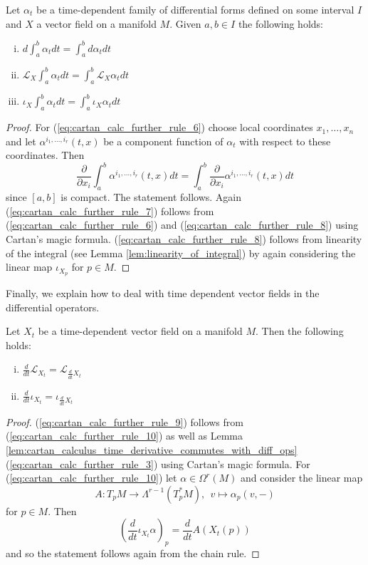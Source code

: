 \begin{lemma}
    Let $\alpha_t$ be a time-dependent family of differential forms defined on some interval $I$ and $X$ a vector field on a manifold $M$. Given $a,b \in I$ the following holds: 
    \begin{enumerate}[(i)]
        \item $d \int_{a}^{b} \alpha_t dt = \int_{a}^{b} d\alpha_t dt$ \label{eq:cartan_calc_further_rule_6}
        \item $\mathcal{L}_X \int_{a}^{b} \alpha_t dt = \int_{a}^{b} \mathcal{L}_X\alpha_t dt$\label{eq:cartan_calc_further_rule_7}
        \item $\iota_X \int_{a}^{b} \alpha_t dt = \int_{a}^{b} \iota_X\alpha_t dt$\label{eq:cartan_calc_further_rule_8}
    \end{enumerate}
\end{lemma}
\begin{proof}
    For (\ref{eq:cartan_calc_further_rule_6}) choose local coordinates $x_1,\ldots,x_n$ and let $\alpha^{i_1,\ldots,i_r}(t,x)$ be a component function of $\alpha_t$ with respect to these coordinates. Then 
    \[
    \frac{\partial}{\partial x_i} \int_{a}^{b} \alpha^{i_1,\ldots,i_r}(t,x) dt = \int_{a}^{b}  \frac{\partial}{\partial x_i} \alpha^{i_1,\ldots,i_r}(t,x) dt
    \]
    since $[a,b]$ is compact. The statement follows. Again (\ref{eq:cartan_calc_further_rule_7}) follows from (\ref{eq:cartan_calc_further_rule_6}) and (\ref{eq:cartan_calc_further_rule_8}) using Cartan's magic formula. (\ref{eq:cartan_calc_further_rule_8}) follows from linearity of the integral (see Lemma \ref{lem:linearity_of_integral}) by again considering the linear map $\iota_{X_p}$ for $p \in M$.
\end{proof}

Finally, we explain how to deal with time dependent vector fields in the differential operators.

\begin{lemma}
    Let $X_t$ be a time-dependent vector field on a manifold $M$. Then the following holds: 
    \begin{enumerate}[(i)]
        \item $\frac{d}{dt} \mathcal{L}_{X_t} = \mathcal{L}_{\frac{d}{dt}X_t}$ \label{eq:cartan_calc_further_rule_9}
        \item $\frac{d}{dt} \iota_{X_t} = \iota_{\frac{d}{dt}X_t}$ \label{eq:cartan_calc_further_rule_10}
    \end{enumerate}
\end{lemma}
\begin{proof}
    (\ref{eq:cartan_calc_further_rule_9}) follows from (\ref{eq:cartan_calc_further_rule_10}) as well as Lemma \ref{lem:cartan_calculus_time_derivative_commutes_with_diff_ops} (\ref{eq:cartan_calc_further_rule_3}) using Cartan's magic formula. For (\ref{eq:cartan_calc_further_rule_10}) let $\alpha \in \Omega^r(M)$ and consider the linear map 
    \[
    A \colon T_p M \to \Lambda^{r-1}(T_p^\ast M), \;\, v \mapsto \alpha_p(v,-)
    \]
    for $p \in M$. Then 
    \[
    \left( \frac{d}{dt} \iota_{X_t} \alpha \right)_p = \frac{d}{dt} A(X_t(p))
    \]
    and so the statement follows again from the chain rule.
\end{proof}

